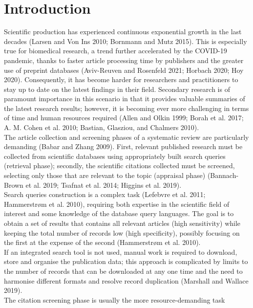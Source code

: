 \documentclass{article}
\begin{document}
\hypertarget{introduction}{%
\section{Introduction}\label{introduction}}

Scientific production has experienced continuous exponential growth in
the last decades (Larsen and Von Ins 2010; Bornmann and Mutz 2015). This
is especially true for biomedical research, a trend further accelerated
by the COVID-19 pandemic, thanks to faster article processing time by
publishers and the greater use of preprint databases (Aviv-Reuven and
Rosenfeld 2021; Horbach 2020; Hoy 2020). Consequently, it has become
harder for researchers and practitioners to stay up to date on the
latest findings in their field. Secondary research is of paramount
importance in this scenario in that it provides valuable summaries of
the latest research results; however, it is becoming ever more
challenging in terms of time and human resources required (Allen and
Olkin 1999; Borah et al. 2017; A. M. Cohen et al. 2010; Bastian,
Glasziou, and Chalmers 2010).\\
The article collection and screening phases of a systematic review are
particularly demanding (Babar and Zhang 2009). First, relevant published
research must be collected from scientific databases using appropriately
built search queries (retrieval phase); secondly, the scientific
citations collected must be screened, selecting only those that are
relevant to the topic (appraisal phase) (Bannach-Brown et al. 2019;
Tsafnat et al. 2014; Higgins et al. 2019).\\
Search queries construction is a complex task (Lefebvre et al. 2011;
Hammerstrøm et al. 2010), requiring both expertise in the scientific
field of interest and some knowledge of the database query languages.
The goal is to obtain a set of results that contains all relevant
articles (high sensitivity) while keeping the total number of records
low (high specificity), possibly focusing on the first at the expense of
the second (Hammerstrøm et al. 2010).\\
If an integrated search tool is not used, manual work is required to
download, store and organise the publication data; this approach is
complicated by limits to the number of records that can be downloaded at
any one time and the need to harmonise different formats and resolve
record duplication (Marshall and Wallace 2019).\\
The citation screening phase is usually the more resource-demanding task
\end{document}

